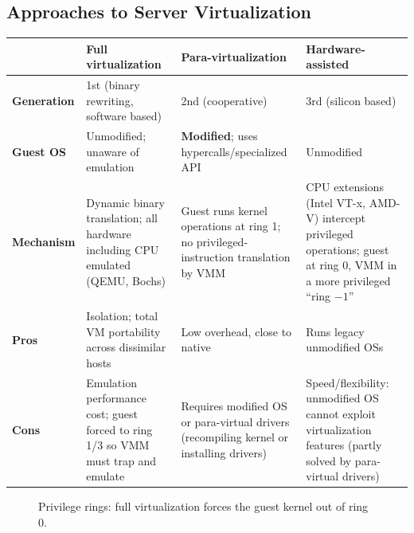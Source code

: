 \subsection{Approaches to Server Virtualization}
\begin{center}
\begin{tabularx}{\textwidth}{>{\bfseries}lXXX}
\toprule
 & Full virtualization & Para-virtualization & Hardware-assisted\\
\midrule
Generation & 1st (binary rewriting, software based) & 2nd (cooperative) & 3rd (silicon based)\\
Guest OS & Unmodified; unaware of emulation & \textbf{Modified}; uses hypercalls/specialized API &
Unmodified\\
Mechanism & Dynamic binary translation; all hardware including CPU emulated (QEMU, Bochs) & Guest runs
kernel operations at ring 1; no privileged-instruction translation by VMM & CPU extensions (Intel VT-x,
AMD-V) intercept privileged operations; guest at ring 0, VMM in a more privileged ``ring $-1$''\\
Pros & Isolation; total VM portability across dissimilar hosts & Low overhead, close to native & Runs
legacy unmodified OSs\\
Cons & Emulation performance cost; guest forced to ring 1/3 so VMM must trap and emulate & Requires modified OS or
para-virtual drivers (recompiling kernel or installing drivers) & Speed/flexibility: unmodified OS cannot
exploit virtualization features (partly solved by para-virtual drivers)\\
\bottomrule
\end{tabularx}
\end{center}

\begin{figure}[H]
\centering
{}
\caption{Privilege rings: full virtualization forces the guest kernel out of ring 0.}
\end{figure}

